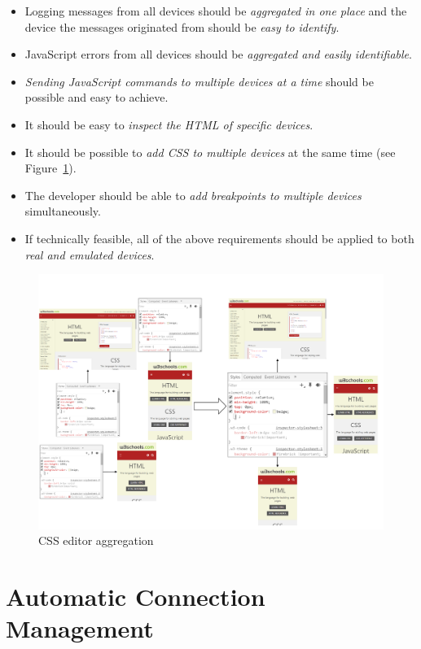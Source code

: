 \begin{itemize}
	\item Logging messages from all devices should be \emph{aggregated in one place} and the device the messages originated from should be \emph{easy to identify}.
	\item JavaScript errors from all devices should be \emph{aggregated and easily identifiable}.
	\item \emph{Sending JavaScript commands to multiple devices at a time} should be possible and easy to achieve. 
	\item It should be easy to \emph{inspect the HTML of specific devices}.
	\item It should be possible to \emph{add CSS to multiple devices} at the same time (see Figure~\ref{fig:css_aggregation}).
	\item The developer should be able to \emph{add breakpoints to multiple devices} simultaneously.
	\item If technically feasible, all of the above requirements should be applied to both \emph{real and emulated devices}.
\end{itemize}

\begin{figure}[H]
  \centering
    \includegraphics[width=1.0\textwidth]{images/css_aggregation_4.pdf}
	\caption[CSS editor aggregation]{CSS editor aggregation}
	\label{fig:css_aggregation}
\end{figure}

\section{Automatic Connection Management}

